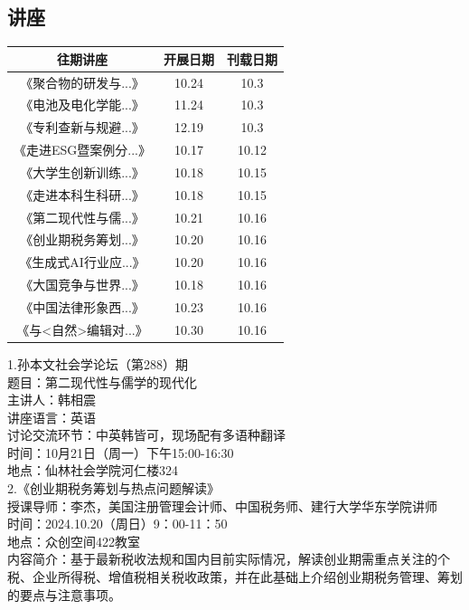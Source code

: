 \documentclass[letterpaper, 12pt]{article}
\begin{document}
\begin{multicols}{2}

\section{讲座}
\begin{tabular}{|c|c|c|}
    \hline
    往期讲座 & 开展日期 & 刊载日期\\
    \hline\hline
    《聚合物的研发与...》 & 10.24 & 10.3\\
    《电池及电化学能...》 & 11.24 & 10.3\\
    《专利查新与规避...》 & 12.19 & 10.3\\
    《走进ESG暨案例分...》 & 10.17 & 10.12\\
    《大学生创新训练...》 & 10.18 & 10.15\\
    《走进本科生科研...》 & 10.18 & 10.15\\
    《第二现代性与儒...》& 10.21 &10.16\\
    《创业期税务筹划...》 & 10.20 & 10.16\\
    《生成式AI行业应...》 & 10.20 & 10.16\\
    《大国竞争与世界...》 & 10.18 & 10.16\\
    《中国法律形象西...》 & 10.23 & 10.16\\
    《与<自然>编辑对...》 & 10.30 & 10.16\\
    \hline
\end{tabular}

1.孙本文社会学论坛（第288）期
\\题目：第二现代性与儒学的现代化
\\主讲人：韩相震
\\讲座语言：英语\\讨论交流环节：中英韩皆可，现场配有多语种翻译
\\时间：10月21日（周一）下午15:00-16:30
\\地点：仙林社会学院河仁楼324\\

2.《创业期税务筹划与热点问题解读》\\
授课导师：李杰，美国注册管理会计师、中国税务师、建行大学华东学院讲师\\
时间：2024.10.20（周日）9：00-11：50\\
地点：众创空间422教室\\
内容简介：基于最新税收法规和国内目前实际情况，解读创业期需重点关注的个税、企业所得税、增值税相关税收政策，并在此基础上介绍创业期税务管理、筹划的要点与注意事项。\\


\end{multicols}
\end{document}
